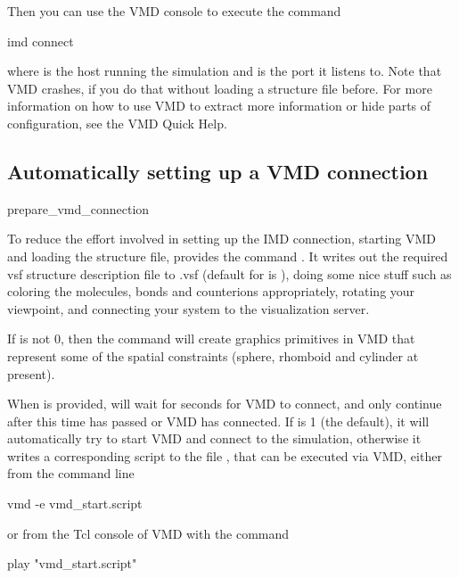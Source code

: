 Then you can use the VMD console to execute the command
\begin{code}
  imd connect  
\end{code}
where  is the host running the simulation and  is
the port it listens to. Note that VMD crashes, if you do that without
loading a structure file before.  For more information on how to use
VMD to extract more information or hide parts of configuration, see
the VMD Quick Help.

\subsection{Automatically setting up a VMD connection}

\begin{essyntax}
prepare_vmd_connection 
\end{essyntax}

To reduce the effort involved in setting up the IMD connection,
starting VMD and loading the structure file, \es provides the command
.  It writes out the required
vsf structure description file to .vsf (default
for  is ), doing some nice stuff such as
coloring the molecules, bonds and counterions appropriately, rotating
your viewpoint, and connecting your system to the visualization
server.

If  is not 0, then the command will create graphics
primitives in VMD that represent some of the spatial constraints
(sphere, rhomboid and cylinder at present).

When  is provided, \es will wait for  seconds for
VMD to connect, and only continue after this time has passed or VMD
has connected. If  is 1 (the default), it will
automatically try to start VMD and connect to the \es simulation,
otherwise it writes a corresponding script to the file
, that can be executed via VMD,
either from the command line
\begin{code}
  vmd -e vmd_start.script
\end{code}
or from the Tcl console of VMD with the command
\begin{code}
  play "vmd\_start.script"
\end{code}

